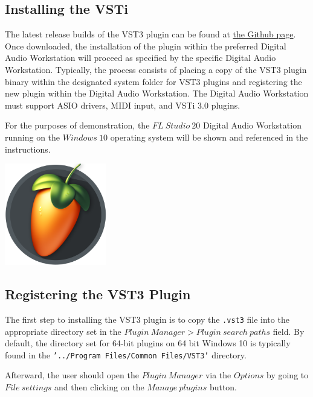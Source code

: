 \documentclass[a4paper,12pt]{report}
\begin{document}
\subsection{Installing the VSTi}
\label{subsec:installvsti}
The latest release builds of the VST3 plugin can be found at \href{https://github.com/ParadoxChains/C3JI5D-Evan-Sitt-BSc-Thesis/tree/master/Release\%20Builds}{the Github page}. Once downloaded, the installation of the plugin within the preferred Digital Audio Workstation will proceed as specified by the specific Digital Audio Workstation. Typically, the process consists of placing a copy of the VST3 plugin binary within the designated system folder for VST3 plugins and registering the new plugin within the Digital Audio Workstation. The Digital Audio Workstation must support ASIO drivers, MIDI input, and VSTi 3.0 plugins.

For the purposes of demonstration, the $FL\ Studio\ 20$ Digital Audio Workstation running on the $Windows\ 10$ operating system will be shown and referenced in the instructions.

\begin{center}
\includegraphics[width=12em]{FLStudioLogo.png}
\end{center}

\subsection{Registering the VST3 Plugin}
\label{subsec:registeringvsti}
The first step to installing the VST3 plugin is to copy the \texttt{.vst3} file into the appropriate directory set in the $Plugin\ Manager > Plugin\ search\ paths$ field. By default, the directory set for 64-bit plugins on 64 bit Windows 10 is typically found in the \texttt{'../Program Files/Common Files/VST3'} directory. 

Afterward, the user should open the $Plugin\ Manager$ via the $Options$ by going to $File\ settings$ and then clicking on the $Manage\ plugins$ button. 
\end{document}
